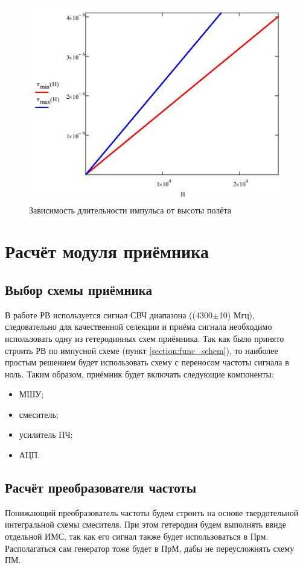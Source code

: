 \documentclass[utf8x, 14pt, oneside, a4paper]{article}
\begin{document}
			\begin{figure}[H]
				\centering
				\includegraphics[width=0.7\linewidth]{"Рисунки/Графики/Длительность импульса"}
				\caption{Зависимость длительности импульса от высоты полёта}
				\label{fig:graf:t_imp}
			\end{figure}
		
	
	\section{Расчёт модуля приёмника}
		\subsection{Выбор схемы приёмника}
			В работе РВ используется сигнал СВЧ диапазона ((4300$\pm$10) Мгц), следовательно для качественной селекции и приёма сигнала необходимо использовать одну из гетеродинных схем приёмника. Так как было принято строить РВ по импусной схеме (пункт \ref{section:func_schem}), то наиболее простым решением будет использовать схему с переносом частоты сигнала в ноль. Таким образом, приёмник будет включать следующие компоненты:
			
			\begin{itemize}
				\item МШУ;
				\item смеситель;
				\item усилитель ПЧ;
				\item АЦП.
			\end{itemize}
			
		\subsection{Расчёт преобразователя частоты}
			Понижающий преобразователь частоты будем строить на основе твердотельной интегральной схемы смесителя. При этом гетеродин будем выполнять ввиде отдельной ИМС, так как его сигнал также будет использоваться в Прм. Располагаться сам генератор тоже будет в ПрМ, дабы не переусложнять схему ПМ.
			
\end{document}
